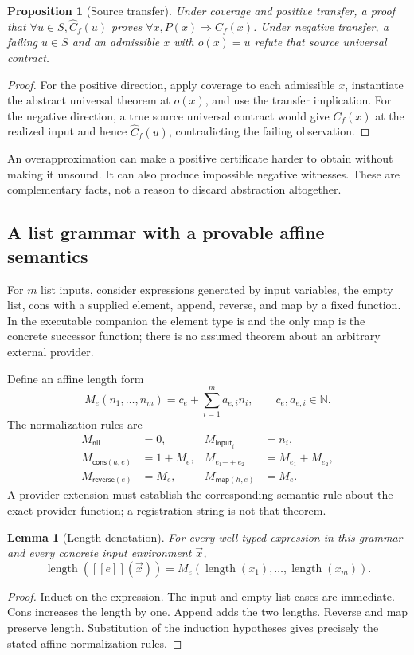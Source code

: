 \documentclass[11pt,letterpaper]{article}
\newcommand{\code}[1]{\texttt{\detokenize{#1}}}
\newcommand{\N}{\mathbb N}\newcommand{\Z}{\mathbb Z}\newcommand{\Q}{\mathbb Q}\newcommand{\R}{\mathbb R}
\newcommand{\den}[1]{[\![#1]\!]}
\newtheorem{proposition}[theorem]{Proposition}
\newtheorem{lemma}[theorem]{Lemma}
\theoremstyle{definition}\newtheorem{definition}[theorem]{Definition}
\theoremstyle{remark}\newtheorem{remark}[theorem]{Remark}
\begin{document}
\begin{proposition}[Source transfer]
Under coverage and positive transfer, a proof that
$\forall u\in S,\widehat C_f(u)$ proves $\forall x,P(x)\Rightarrow C_f(x)$.
Under negative transfer, a failing $u\in S$ and an admissible $x$ with
$o(x)=u$ refute that source universal contract.
\end{proposition}
\begin{proof}
For the positive direction, apply coverage to each admissible $x$, instantiate
the abstract universal theorem at $o(x)$, and use the transfer implication.
For the negative direction, a true source universal contract would give
$C_f(x)$ at the realized input and hence $\widehat C_f(u)$, contradicting
the failing observation.
\end{proof}

An overapproximation can make a positive certificate harder to obtain without
making it unsound. It can also produce impossible negative witnesses. These
are complementary facts, not a reason to discard abstraction altogether.

\subsection{A list grammar with a provable affine semantics}
For $m$ list inputs, consider expressions generated by input variables, the
empty list, cons with a supplied element, append, reverse, and map by a fixed
function. In the executable companion the element type is \code{Nat} and the
only map is the concrete successor function; there is no assumed theorem
about an arbitrary external provider.

Define an affine length form
\[
 M_e(n_1,\ldots,n_m)=c_e+\sum_{i=1}^{m}a_{e,i}n_i,
 \qquad c_e,a_{e,i}\in\N.
\]
The normalization rules are
\begin{align*}
 M_{\mathsf{nil}}&=0,&M_{\mathsf{input}_i}&=n_i,\\
 M_{\mathsf{cons}(a,e)}&=1+M_e,&
 M_{e_1\mathbin{+\!+}e_2}&=M_{e_1}+M_{e_2},\\
 M_{\mathsf{reverse}(e)}&=M_e,&M_{\mathsf{map}(h,e)}&=M_e.
\end{align*}
A provider extension must establish the corresponding semantic rule about
the exact provider function; a registration string is not that theorem.

\begin{lemma}[Length denotation]
For every well-typed expression in this grammar and every concrete input
environment $\vec x$,
\[
 \operatorname{length}(\den{e}(\vec x))
     =M_e(\operatorname{length}(x_1),\ldots,\operatorname{length}(x_m)).
\]
\end{lemma}
\begin{proof}
Induct on the expression. The input and empty-list cases are immediate.
Cons increases the length by one. Append adds the two lengths. Reverse and
map preserve length. Substitution of the induction hypotheses gives precisely
the stated affine normalization rules.
\end{proof}
\end{document}
